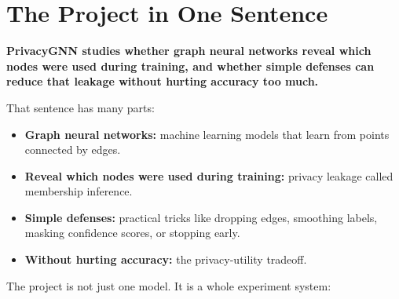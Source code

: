 \documentclass[11pt,a4paper]{article}
\begin{document}
\section{The Project in One Sentence}

\textbf{PrivacyGNN studies whether graph neural networks reveal which nodes were used during training, and whether simple defenses can reduce that leakage without hurting accuracy too much.}

That sentence has many parts:

\begin{itemize}
  \item \textbf{Graph neural networks:} machine learning models that learn from points connected by edges.
  \item \textbf{Reveal which nodes were used during training:} privacy leakage called membership inference.
  \item \textbf{Simple defenses:} practical tricks like dropping edges, smoothing labels, masking confidence scores, or stopping early.
  \item \textbf{Without hurting accuracy:} the privacy-utility tradeoff.
\end{itemize}

The project is not just one model. It is a whole experiment system:

\begin{center}
\end{center}
\end{document}
